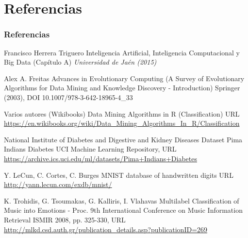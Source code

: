 \documentclass[8pt]{beamer}
\newcommand{\hlink}[2]{{\color{blue}\href{#1}{#2}}}
\begin{document}
\section {Referencias}
\begin{frame}
\frametitle{Referencias}
\footnotesize{
  \begin{thebibliography}{99} %
     Francisco Herrera Triguero
      \newblock Inteligencia Artificial, Inteligencia Computacional y Big Data (Capítulo A)
      \newblock \emph{Universidad de Jaén (2015)}
      
      Alex A. Freitas
       \newblock Advances in Evolutionary Computing (A Survey of Evolutionary Algorithms for Data Mining and Knowledge Discovery - Introduction)
       \newblock Springer (2003), DOI 10.1007/978-3-642-18965-4\_33
       
      Varios autores (Wikibooks)
       \newblock Data Mining Algorithms in R (Classification)
       \newblock URL \hlink{https://en.wikibooks.org/wiki/Data\_Mining\_Algorithms\_In\_R/Classification}{https://en.wikibooks.org/wiki/Data\_Mining\_Algorithms\_In\_R/Classification}
       
      National Institute of Diabetes and Digestive and Kidney Diseases
	   \newblock Dataset Pima Indians Diabetes
	   \newblock UCI Machine Learning Repository, URL \hlink{https://archive.ics.uci.edu/ml/datasets/Pima+Indians+Diabetes}{https://archive.ics.uci.edu/ml/datasets/Pima+Indians+Diabetes}
	 
	  Y. LeCun, C. Cortes, C. Burges
	   \newblock MNIST database of handwritten digits
	   \newblock URL \hlink{http://yann.lecun.com/exdb/mnist/}{http://yann.lecun.com/exdb/mnist/}

	 K. Trohidis, G. Tsoumakas, G. Kalliris, I. Vlahavas
		\newblock Multilabel Classification of Music into Emotions - Proc. 9th International Conference on Music Information Retrieval
		\newblock ISMIR 2008, pp. 325-330, URL \hlink{http://mlkd.csd.auth.gr/publication\_details.asp?publicationID=269}{http://mlkd.csd.auth.gr/publication\_details.asp?publicationID=269}
  \end{thebibliography}
}
\end{frame}
\end{document}
